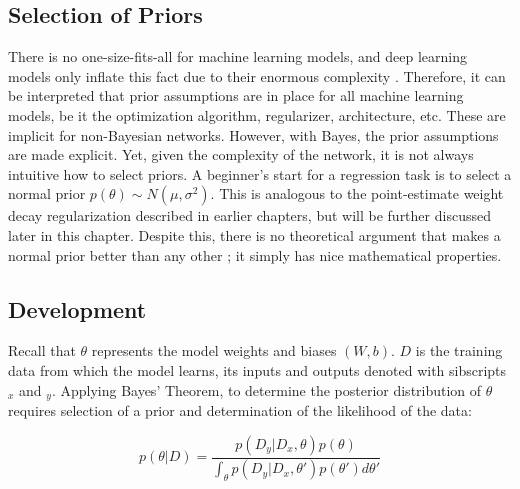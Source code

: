 \subsection{Selection of Priors}

There is no one-size-fits-all for machine learning models, and deep learning models only inflate this fact due to their enormous complexity \cite{Goodfellow-et-al-2016}.  Therefore, it can be interpreted \cite{Jospin} that prior assumptions are in place for all machine learning models, be it the optimization algorithm, regularizer, architecture, etc. These are implicit for non-Bayesian networks.  However, with Bayes, the prior assumptions are made explicit.  Yet, given the complexity of the network, it is not always intuitive how to select priors.  A beginner's start for a regression task is to select a normal prior $p(\theta) \sim N(\mu,\sigma^2)$.  This is analogous to the point-estimate weight decay regularization described in earlier chapters, but will be further discussed later in this chapter.  Despite this, there is no theoretical argument that makes a normal prior better than any other \cite{silvestro2020prior}; it simply has nice mathematical properties.


\subsection{Development}

Recall that $\theta$ represents the model weights and biases $(W,b)$.  $D$ is the training data from which the model learns, its inputs and outputs denoted with sibscripts $_x$ and $_y$.  Applying Bayes' Theorem, to determine the posterior distribution of $\theta$ requires selection of a prior and determination of the likelihood of the data:

$$
p(\theta|D) = \frac{p(D_{y}|D_{x},\theta)p(\theta)}{\int_\theta p(D_{y}|D_{x},\theta')p(\theta')d\theta'}
$$

